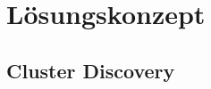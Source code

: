 \section{Lösungskonzept} \label{s:solution}


\subsection{Cluster Discovery} \label{ss:cluster-discovery}

